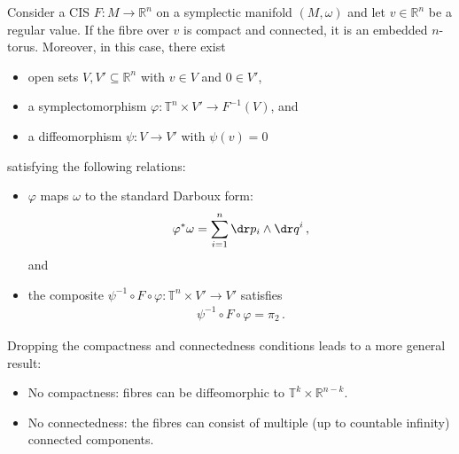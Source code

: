 
    \begin{theorem}
        Consider a CIS $F:M\rightarrow\mathbb{R}^n$ on a symplectic manifold $(M,\omega)$ and let $v\in\mathbb{R}^n$ be a regular value. If the fibre over $v$ is compact and connected, it is an embedded $n$-torus. Moreover, in this case, there exist
        \begin{itemize}
            \item open sets $V,V'\subseteq\mathbb{R}^n$ with $v\in V$ and $0\in V'$,
            \item a symplectomorphism $\varphi:\mathbb{T}^n\times V'\rightarrow F^{-1}(V)$, and
            \item a diffeomorphism $\psi:V\rightarrow V'$ with $\psi(v)=0$
        \end{itemize}
        satisfying the following relations:
        \begin{itemize}
            \item $\varphi$ maps $\omega$ to the standard Darboux form:
                \begin{gather}
                    \varphi^*\omega = \sum_{i=1}^n\dr p_i\wedge\dr q^i\,,
                \end{gather}
            and
            \item the composite $\psi^{-1}\circ F\circ\varphi:\mathbb{T}^n\times V'\rightarrow V'$ satisfies
                \begin{gather}
                    \label{symplectic:liouville_arnold_hamiltonian}
                    \psi^{-1}\circ F\circ\varphi = \pi_2\,.
                \end{gather}
        \end{itemize}
    \end{theorem}
    \begin{remark}
        Dropping the compactness and connectedness conditions leads to a more general result:
        \begin{itemize}
            \item No compactness: fibres can be diffeomorphic to $\mathbb{T}^k\times\mathbb{R}^{n-k}$.
            \item No connectedness: the fibres can consist of multiple (up to countable infinity) connected components.
        \end{itemize}
    \end{remark}


